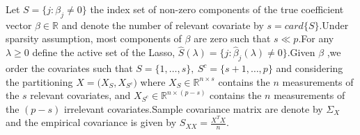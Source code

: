 \documentclass[12pt]{report}
\begin{document}
Let $S=\big\{j:\beta_{j}\neq 0\big \}$ the index set of non-zero components of the true coefficient vector $\beta \in \mathbb{R}$ and denote the number of relevant covariate by $s=card\{S\}$.Under sparsity assumption, most components of $\beta$ are zero such that $s\ll p$.For any $\lambda\geqslant 0$ define the active set of the Lasso, $\hat{S}(\lambda)=\big\{j:\hat{\beta}_{j}(\lambda)\neq 0\}$.Given $\beta$ ,we order the covariates such that $S=\big\{1,\dots,s\},\ S^{c} =\big\{s+1,\dots,p\big \}$ and considering the partitioning $X=\big(X_{S},X_{S^{c}}\big)$ where $X_{S}\in \mathbb{R}^{n\times s}$ contains the $n$ measurements of the $s$ relevant covariates, and  $X_{S^{c}}\in \mathbb{R}^{n\times(p-s) }$ contains the $n$  measurements of the $(p-s)$ irrelevant covariates.Sample covariance matrix are denote by $\Sigma_{X}$ and the empirical covariance is given by $S_{XX}=\frac{X^{T}X}{n}$.
\end{document}

